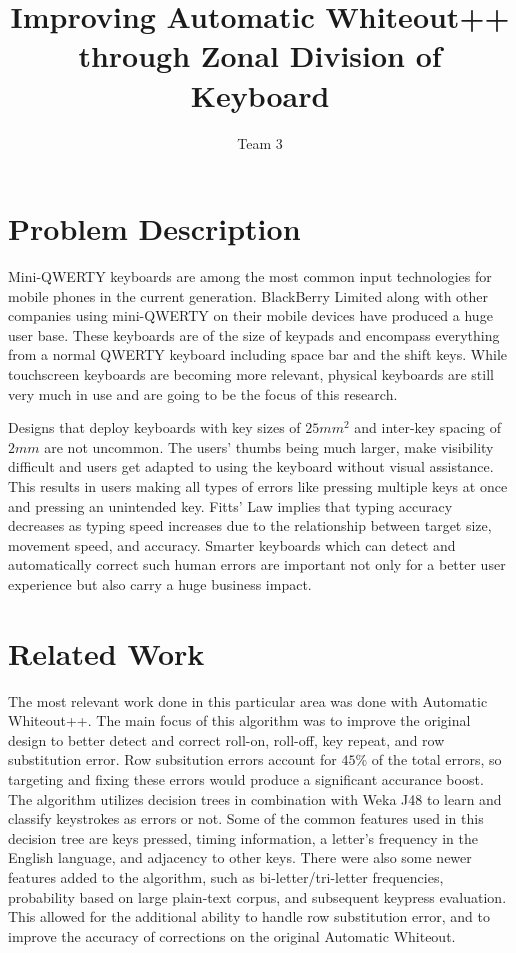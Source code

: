 \documentclass[letterpaper, 9 pt, conference]{ieeeconf}  %
\title{\LARGE \bf
Improving Automatic Whiteout++ through Zonal Division of Keyboard
}
\author{Team 3}
\begin{document}
\maketitle
\thispagestyle{empty}
\pagestyle{empty}
\nocite{*} %

\section{Problem Description}
Mini-QWERTY keyboards are among the most common input technologies for mobile phones in the current generation. BlackBerry Limited along with other companies using mini-QWERTY on their mobile devices have produced a huge user base. These keyboards are of the size of keypads and encompass everything from a normal QWERTY keyboard including space bar and the shift keys.  While touchscreen keyboards are becoming more relevant, physical keyboards are still very much in use and are going to be the focus of this research.

Designs that deploy keyboards with key sizes of $25 mm^{2}$ and inter-key spacing of $2 mm$\cite{clawson2006mobile} are not uncommon. The users’ thumbs being much larger, make visibility difficult and users get adapted to using the keyboard without visual assistance. This results in users making all types of errors like pressing multiple keys at once and pressing an unintended key. Fitts’ Law implies that typing accuracy decreases as typing speed increases due to the relationship between target size, movement speed, and accuracy\cite{soukoreff2004towards}.  Smarter keyboards which can detect and automatically correct such human errors are important not only for a better user experience but also carry a huge business impact.

\section{Related Work}
The most relevant work done in this particular area was done with Automatic Whiteout++.  The main focus of this algorithm was to improve the original design to better detect and correct roll-on, roll-off, key repeat, and row substitution error.  Row subsitution errors account for $45\%$ of the total errors, so targeting and fixing these errors would produce a significant accurance boost\cite{clawson2008automatic}.  The algorithm utilizes decision trees in combination with Weka J48 to learn and classify keystrokes as errors or not.  Some of the common features used in this decision tree are keys pressed, timing information, a letter’s frequency in the English language, and adjacency to other keys.  There were also some newer features added to the algorithm, such as bi-letter/tri-letter frequencies, probability based on large plain-text corpus, and subsequent keypress evaluation.  This allowed for the additional ability to handle row substitution error, and to improve the accuracy of corrections on the original Automatic Whiteout.
\end{document}
